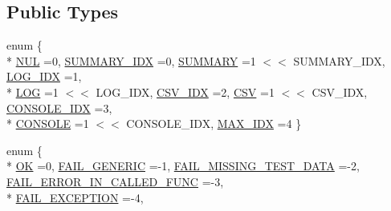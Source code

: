 \subsection*{Public Types}
\begin{DoxyCompactItemize}
\item 
enum \{ \\*
\hyperlink{classcvtest_1_1TS_a4d6d5cf94c1f5e8cdaddf2a2efe1be0aa1c062280e7a59a931c4f03ee4c1b158f}{N\-U\-L} =0, 
\hyperlink{classcvtest_1_1TS_a4d6d5cf94c1f5e8cdaddf2a2efe1be0aaaa92a9f3443f1671cb5b73269c9f073e}{S\-U\-M\-M\-A\-R\-Y\-\_\-\-I\-D\-X} =0, 
\hyperlink{classcvtest_1_1TS_a4d6d5cf94c1f5e8cdaddf2a2efe1be0aa7176d64f3ee15d224cec1243f5c55bc0}{S\-U\-M\-M\-A\-R\-Y} =1 $<$$<$ S\-U\-M\-M\-A\-R\-Y\-\_\-\-I\-D\-X, 
\hyperlink{classcvtest_1_1TS_a4d6d5cf94c1f5e8cdaddf2a2efe1be0aa6e04785c7ce5cfb15740a85dac48def6}{L\-O\-G\-\_\-\-I\-D\-X} =1, 
\\*
\hyperlink{classcvtest_1_1TS_a4d6d5cf94c1f5e8cdaddf2a2efe1be0aa870fd938e356ac596488309d1b183f18}{L\-O\-G} =1 $<$$<$ L\-O\-G\-\_\-\-I\-D\-X, 
\hyperlink{classcvtest_1_1TS_a4d6d5cf94c1f5e8cdaddf2a2efe1be0aa683cdac73d2a3b6ccc690b34013ac58b}{C\-S\-V\-\_\-\-I\-D\-X} =2, 
\hyperlink{classcvtest_1_1TS_a4d6d5cf94c1f5e8cdaddf2a2efe1be0aac3dca960e6d1103c9ed6339a3b1283b9}{C\-S\-V} =1 $<$$<$ C\-S\-V\-\_\-\-I\-D\-X, 
\hyperlink{classcvtest_1_1TS_a4d6d5cf94c1f5e8cdaddf2a2efe1be0aa0fc2fe2a35006b4f6b9a3632d572b3ad}{C\-O\-N\-S\-O\-L\-E\-\_\-\-I\-D\-X} =3, 
\\*
\hyperlink{classcvtest_1_1TS_a4d6d5cf94c1f5e8cdaddf2a2efe1be0aa06ed0a34b57140b3610722f6bd80d0e4}{C\-O\-N\-S\-O\-L\-E} =1 $<$$<$ C\-O\-N\-S\-O\-L\-E\-\_\-\-I\-D\-X, 
\hyperlink{classcvtest_1_1TS_a4d6d5cf94c1f5e8cdaddf2a2efe1be0aa223feca68f6657aca9967e4f4e405612}{M\-A\-X\-\_\-\-I\-D\-X} =4
 \}
\item 
enum \{ \\*
\hyperlink{classcvtest_1_1TS_aac32441593fd01cf004b7353792857dba6416c4e350f88fdee91ad82672eb3eab}{O\-K} =0, 
\hyperlink{classcvtest_1_1TS_aac32441593fd01cf004b7353792857dba8f3b9fb25fd83e7a6aa421de3f4e8619}{F\-A\-I\-L\-\_\-\-G\-E\-N\-E\-R\-I\-C} =-\/1, 
\hyperlink{classcvtest_1_1TS_aac32441593fd01cf004b7353792857dba6188ceee7ee9cb915e9f087e9a70ffcd}{F\-A\-I\-L\-\_\-\-M\-I\-S\-S\-I\-N\-G\-\_\-\-T\-E\-S\-T\-\_\-\-D\-A\-T\-A} =-\/2, 
\hyperlink{classcvtest_1_1TS_aac32441593fd01cf004b7353792857dba5d0fec153196ccfbe71327c9f1874ce1}{F\-A\-I\-L\-\_\-\-E\-R\-R\-O\-R\-\_\-\-I\-N\-\_\-\-C\-A\-L\-L\-E\-D\-\_\-\-F\-U\-N\-C} =-\/3, 
\\*
\hyperlink{classcvtest_1_1TS_aac32441593fd01cf004b7353792857dba8848f83c82d2ed70bbf38fe3b05bc061}{F\-A\-I\-L\-\_\-\-E\-X\-C\-E\-P\-T\-I\-O\-N} =-\/4, 

\end{DoxyCompactItemize}

